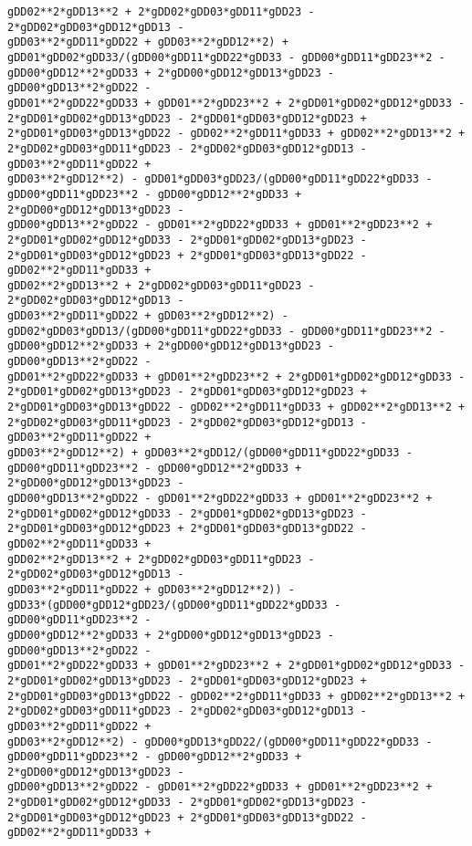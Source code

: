 \documentclass[landscape,letterpaper,10pt,english]{article}
\begin{document}
\begin{Verbatim}[commandchars=\\\{\}]
gDD02**2*gDD13**2 + 2*gDD02*gDD03*gDD11*gDD23 - 2*gDD02*gDD03*gDD12*gDD13 -
gDD03**2*gDD11*gDD22 + gDD03**2*gDD12**2) +
gDD01*gDD02*gDD33/(gDD00*gDD11*gDD22*gDD33 - gDD00*gDD11*gDD23**2 -
gDD00*gDD12**2*gDD33 + 2*gDD00*gDD12*gDD13*gDD23 - gDD00*gDD13**2*gDD22 -
gDD01**2*gDD22*gDD33 + gDD01**2*gDD23**2 + 2*gDD01*gDD02*gDD12*gDD33 -
2*gDD01*gDD02*gDD13*gDD23 - 2*gDD01*gDD03*gDD12*gDD23 +
2*gDD01*gDD03*gDD13*gDD22 - gDD02**2*gDD11*gDD33 + gDD02**2*gDD13**2 +
2*gDD02*gDD03*gDD11*gDD23 - 2*gDD02*gDD03*gDD12*gDD13 - gDD03**2*gDD11*gDD22 +
gDD03**2*gDD12**2) - gDD01*gDD03*gDD23/(gDD00*gDD11*gDD22*gDD33 -
gDD00*gDD11*gDD23**2 - gDD00*gDD12**2*gDD33 + 2*gDD00*gDD12*gDD13*gDD23 -
gDD00*gDD13**2*gDD22 - gDD01**2*gDD22*gDD33 + gDD01**2*gDD23**2 +
2*gDD01*gDD02*gDD12*gDD33 - 2*gDD01*gDD02*gDD13*gDD23 -
2*gDD01*gDD03*gDD12*gDD23 + 2*gDD01*gDD03*gDD13*gDD22 - gDD02**2*gDD11*gDD33 +
gDD02**2*gDD13**2 + 2*gDD02*gDD03*gDD11*gDD23 - 2*gDD02*gDD03*gDD12*gDD13 -
gDD03**2*gDD11*gDD22 + gDD03**2*gDD12**2) -
gDD02*gDD03*gDD13/(gDD00*gDD11*gDD22*gDD33 - gDD00*gDD11*gDD23**2 -
gDD00*gDD12**2*gDD33 + 2*gDD00*gDD12*gDD13*gDD23 - gDD00*gDD13**2*gDD22 -
gDD01**2*gDD22*gDD33 + gDD01**2*gDD23**2 + 2*gDD01*gDD02*gDD12*gDD33 -
2*gDD01*gDD02*gDD13*gDD23 - 2*gDD01*gDD03*gDD12*gDD23 +
2*gDD01*gDD03*gDD13*gDD22 - gDD02**2*gDD11*gDD33 + gDD02**2*gDD13**2 +
2*gDD02*gDD03*gDD11*gDD23 - 2*gDD02*gDD03*gDD12*gDD13 - gDD03**2*gDD11*gDD22 +
gDD03**2*gDD12**2) + gDD03**2*gDD12/(gDD00*gDD11*gDD22*gDD33 -
gDD00*gDD11*gDD23**2 - gDD00*gDD12**2*gDD33 + 2*gDD00*gDD12*gDD13*gDD23 -
gDD00*gDD13**2*gDD22 - gDD01**2*gDD22*gDD33 + gDD01**2*gDD23**2 +
2*gDD01*gDD02*gDD12*gDD33 - 2*gDD01*gDD02*gDD13*gDD23 -
2*gDD01*gDD03*gDD12*gDD23 + 2*gDD01*gDD03*gDD13*gDD22 - gDD02**2*gDD11*gDD33 +
gDD02**2*gDD13**2 + 2*gDD02*gDD03*gDD11*gDD23 - 2*gDD02*gDD03*gDD12*gDD13 -
gDD03**2*gDD11*gDD22 + gDD03**2*gDD12**2)) -
gDD33*(gDD00*gDD12*gDD23/(gDD00*gDD11*gDD22*gDD33 - gDD00*gDD11*gDD23**2 -
gDD00*gDD12**2*gDD33 + 2*gDD00*gDD12*gDD13*gDD23 - gDD00*gDD13**2*gDD22 -
gDD01**2*gDD22*gDD33 + gDD01**2*gDD23**2 + 2*gDD01*gDD02*gDD12*gDD33 -
2*gDD01*gDD02*gDD13*gDD23 - 2*gDD01*gDD03*gDD12*gDD23 +
2*gDD01*gDD03*gDD13*gDD22 - gDD02**2*gDD11*gDD33 + gDD02**2*gDD13**2 +
2*gDD02*gDD03*gDD11*gDD23 - 2*gDD02*gDD03*gDD12*gDD13 - gDD03**2*gDD11*gDD22 +
gDD03**2*gDD12**2) - gDD00*gDD13*gDD22/(gDD00*gDD11*gDD22*gDD33 -
gDD00*gDD11*gDD23**2 - gDD00*gDD12**2*gDD33 + 2*gDD00*gDD12*gDD13*gDD23 -
gDD00*gDD13**2*gDD22 - gDD01**2*gDD22*gDD33 + gDD01**2*gDD23**2 +
2*gDD01*gDD02*gDD12*gDD33 - 2*gDD01*gDD02*gDD13*gDD23 -
2*gDD01*gDD03*gDD12*gDD23 + 2*gDD01*gDD03*gDD13*gDD22 - gDD02**2*gDD11*gDD33 +

\end{Verbatim}
\end{document}
